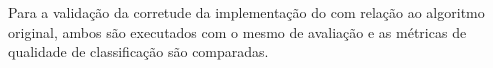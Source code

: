 




Para a validação da corretude da implementação do \mfog com relação ao algoritmo
\minas original, ambos são executados com o mesmo \dataset de avaliação e as métricas de
qualidade de classificação são comparadas.



